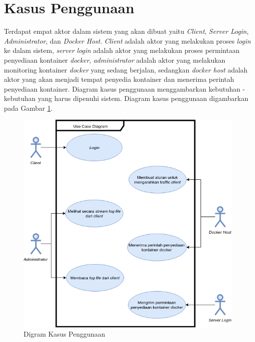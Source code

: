 \section{Kasus Penggunaan}
Terdapat empat aktor dalam sistem yang akan dibuat yaitu \textit{Client}, \textit{Server Login}, \textit{Administrator}, dan \textit{Docker Host}. \textit{Client} adalah aktor yang melakukan proses \textit{login} ke dalam sistem, \textit{server login} adalah aktor yang melakukan proses permintaan penyediaan kontainer \textit{docker}, \textit{administrator} adalah aktor yang melakukan monitoring kontainer \textit{docker} yang sedang berjalan, sedangkan \textit{docker host} adalah aktor yang akan menjadi tempat penyedia kontainer dan menerima perintah penyediaan kontainer. Diagram kasus penggunaan menggambarkan kebutuhan - kebutuhan yang harus dipenuhi sistem. Diagram kasus penggunaan digambarkan pada Gambar \ref{gambarDiagramKasusPenggunaan}.
\begin{figure}[!h] %
	\centering
	\includegraphics[width=\linewidth]{images/bab3/usecase}
	\caption{Digram Kasus Penggunaan}
	\label{gambarDiagramKasusPenggunaan}
\end{figure}
\\

